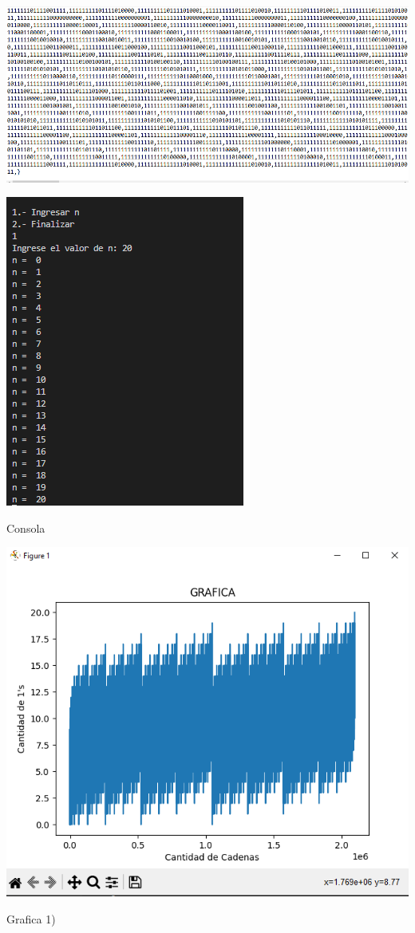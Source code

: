 \documentclass{article}
\begin{document}
\begin{center}
    \includegraphics[scale = 0.7]{UniversoFile2.png}
    \caption{}
\end{center}

\begin{center}
    \includegraphics[scale = 0.7]{console.png}
    \caption{Consola}
\end{center}

\begin{center}
    \includegraphics[scale = 0.7]{graphic1.png}
    \caption{Grafica 1)}
\end{center}
\end{document}
